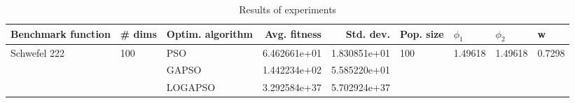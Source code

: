\begin{table}
\centering
\caption{Results of experiments}
\begin{tabular}{lllrrllll}
\toprule
           Benchmark function &              \# dims & Optim. algorithm &  Avg. fitness &    Std. dev. &            Pop. size &               $\phi_{1}$ &               $\phi_{2}$ &                       w \\
\midrule
\multirow{3}{*}{Schwefel 222} & \multirow{3}{*}{100} &              PSO &  6.462661e+01 & 1.830851e+01 & \multirow{3}{*}{100} & \multirow{3}{*}{1.49618} & \multirow{3}{*}{1.49618} & \multirow{3}{*}{0.7298} \\
                              &                      &            GAPSO &  1.442234e+02 & 5.585220e+01 &                      &                          &                          &                         \\
                              &                      &          LOGAPSO &  3.292584e+37 & 5.702924e+37 &                      &                          &                          &                         \\
\bottomrule
\end{tabular}
\end{table}
